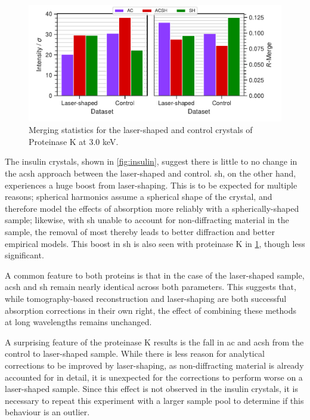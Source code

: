 \begin{figure}[h]
    \centering
    \includegraphics{plots/exp2/prot_stats.pdf}
    \caption{Merging statistics for the laser-shaped and control crystals of Proteinase K at 3.0 \unit{keV}.}
    \label{fig:proteinasek}
\end{figure}

The insulin crystals, shown in \cref{fig:insulin}, suggest there is little to no change in the \ac{acsh} approach between the laser-shaped and control. \Ac{sh}, on the other hand, experiences a huge boost from laser-shaping. This is to be expected for multiple reasons; spherical harmonics assume a spherical shape of the crystal, and therefore model the effects of absorption more reliably with a spherically-shaped sample; likewise, with \ac{sh} unable to account for non-diffracting material in the sample, the removal of most thereby leads to better diffraction and better empirical models. This boost in \ac{sh} is also seen with proteinase K in \cref{fig:proteinasek}, though less significant.

A common feature to both proteins is that in the case of the laser-shaped sample, \ac{acsh} and \ac{sh} remain nearly identical across both parameters.
This suggests that, while tomography-based reconstruction and laser-shaping are both successful absorption corrections in their own right, the effect of combining these methods at long wavelengths remains unchanged.

A surprising feature of the proteinase K results is the fall in \ac{ac} and \ac{acsh} from the control to laser-shaped sample. While there is less reason for analytical corrections to be improved by laser-shaping, as non-diffracting material is already accounted for in detail, it is unexpected for the corrections to perform worse on a laser-shaped sample. Since this effect is not observed in the insulin crystals, it is necessary to repeat this experiment with a larger sample pool to determine if this behaviour is an outlier.%

